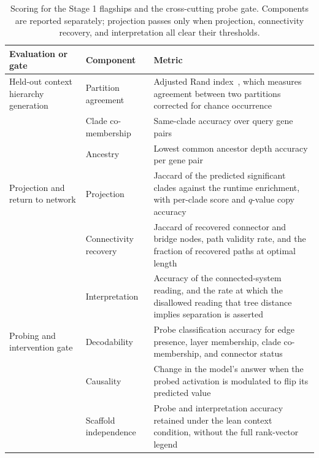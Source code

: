 \documentclass[thesis,letterpaper,12pt]{utthesis}
\begin{document}
\begin{table}[htb!]
\centering
\caption[Scoring for the Stage 1 flagships and probe gate]{Scoring for the Stage 1 flagships and the cross-cutting probe gate. Components are reported separately; projection passes only when projection, connectivity recovery, and interpretation all clear their thresholds.}
\label{tab:ch4-flagship-scoring}
\footnotesize
\setlength{\tabcolsep}{4pt}
\renewcommand{\arraystretch}{1.15}
\begin{tabularx}{\textwidth}{@{}>{\raggedright\arraybackslash}p{} >{\raggedright\arraybackslash}p{} Y@{}}
\toprule
\textbf{Evaluation or gate} & \textbf{Component} & \textbf{Metric} \\
\midrule
Held-out context hierarchy generation
  & Partition agreement & Adjusted Rand index~\cite{hubert1985comparing}, which measures agreement between two partitions corrected for chance occurrence \\
\cmidrule(l){2-3}
  & Clade co-membership & Same-clade accuracy over query gene pairs \\
\cmidrule(l){2-3}
  & Ancestry & Lowest common ancestor depth accuracy per gene pair \\
\midrule
Projection and return to network
  & Projection & Jaccard of the predicted significant clades against the runtime enrichment, with per-clade score and $q$-value copy accuracy \\
\cmidrule(l){2-3}
  & Connectivity recovery & Jaccard of recovered connector and bridge nodes, path validity rate, and the fraction of recovered paths at optimal length \\
\cmidrule(l){2-3}
  & Interpretation & Accuracy of the connected-system reading, and the rate at which the disallowed reading that tree distance implies separation is asserted \\
\midrule
Probing and intervention gate
  & Decodability & Probe classification accuracy for edge presence, layer membership, clade co-membership, and connector status \\
\cmidrule(l){2-3}
  & Causality & Change in the model's answer when the probed activation is modulated to flip its predicted value \\
\cmidrule(l){2-3}
  & Scaffold independence & Probe and interpretation accuracy retained under the lean context condition, without the full rank-vector legend \\
\bottomrule
\end{tabularx}
\end{table}
\end{document}

